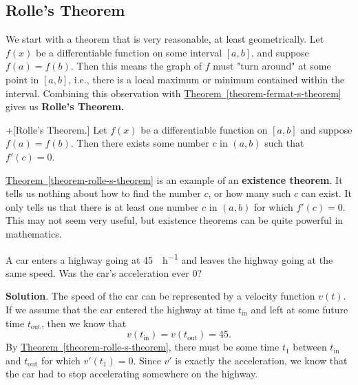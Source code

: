 \documentclass[10pt,]{book}
\newcommand{\terminology}[1]{\textbf{#1}}
\theoremstyle{ptxplainnotitle}
\theoremstyle{ptxplaintitle}
\theoremstyle{ptxplainnotitle}
\theoremstyle{ptxplaintitle}
\theoremstyle{ptxplainnotitle}
\theoremstyle{ptxplaintitle}
\theoremstyle{ptxdefinitionnotitle}
\theoremstyle{ptxdefinitiontitle}
\theoremstyle{ptxdefinitionnotitle}
\theoremstyle{ptxdefinitiontitle}
\theoremstyle{ptxdefinitionnotitle}
\theoremstyle{ptxdefinitiontitle}
\theoremstyle{ptxdefinitionnotitle}
\theoremstyle{ptxdefinitiontitle}
\theoremstyle{ptxdefinitionnotitle}
\theoremstyle{ptxdefinitiontitle}
\numberwithin{equation}{section}
\begin{document}
\subsection[{Rolle's Theorem}]{Rolle's Theorem}\label{subsection-rolle-s-theorem}
\hypertarget{p-329}{}%
We start with a theorem that is very reasonable, at least geometrically. Let \(f(x)\) be a differentiable function on some interval \([a,b]\), and suppose \(f(a) = f(b)\). Then this means the graph of \(f\) must "turn around" at some point in \([a,b]\), i.e., there is a local maximum or minimum contained within the interval. Combining this observation with \hyperref[theorem-fermat-s-theorem]{Theorem~\ref{theorem-fermat-s-theorem}} gives us \terminology{Rolle's Theorem.}%
\begin{theorem}+[{Rolle's Theorem.}]\label{theorem-rolle-s-theorem}
\hypertarget{p-330}{}%
Let \(f(x)\) be a differentiable function on \([a,b]\) and suppose \(f(a) = f(b)\). Then there exists some number \(c\) in \((a,b)\) such that \(f'(c) = 0\).%
\end{theorem}
\hypertarget{p-331}{}%
\hyperref[theorem-rolle-s-theorem]{Theorem~\ref{theorem-rolle-s-theorem}} is an example of an \terminology{existence theorem}. It tells us nothing about how to find the number \(c\), or how many such \(c\) can exist. It only tells us that there is at least one number \(c\) in \((a,b)\) for which \(f'(c) = 0\). This may not seem very useful, but existence theorems can be quite powerful in mathematics.%
\begin{example}\label{example-rolle-s-theorem-and-traffic}
\hypertarget{p-332}{}%
A car enters a highway going at \SI{45}{\mile\per\hour} and leaves the highway going at the same speed. Was the car's acceleration ever \(0\)?%
\par\smallskip%
\noindent\textbf{Solution}.\hypertarget{solution-73}{}\quad%
\hypertarget{p-333}{}%
The speed of the car can be represented by a velocity function \(v(t)\). If we assume that the car entered the highway at time \(t_{\text{in}}\) and left at some future time \(t_{\text{out}}\), then we know that%
\begin{equation*}
v(t_{\text{in}}) = v(t_{\text{out}}) = 45.
\end{equation*}
By \hyperref[theorem-rolle-s-theorem]{Theorem~\ref{theorem-rolle-s-theorem}}, there must be some time \(t_{1}\) between \(t_{\text{in}}\) and \(t_{\text{out}}\) for which \(v'(t_{1}) = 0\). Since \(v'\) is exactly the acceleration, we know that the car had to stop accelerating somewhere on the highway.%
\end{example}
\typeout{************************************************}
\typeout{************************************************}
\end{document}
